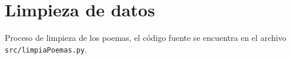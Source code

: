 \section{Limpieza de datos}



Proceso de limpieza de los poemas, el código fuente se encuentra en el archivo \texttt{src/limpiaPoemas.py}.

